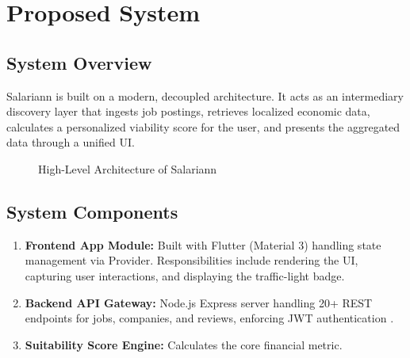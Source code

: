 \chapter{Proposed System}

\section{System Overview}
Salariann is built on a modern, decoupled architecture. It acts as an intermediary discovery layer that ingests job postings, retrieves localized economic data, calculates a personalized viability score for the user, and presents the aggregated data through a unified UI.

\begin{figure}[H]
\centering
{}
\caption{High-Level Architecture of Salariann}
\end{figure}

\section{System Components}
\begin{enumerate}
    \item \textbf{Frontend App Module:} Built with Flutter (Material 3) handling state management via Provider. Responsibilities include rendering the UI, capturing user interactions, and displaying the traffic-light badge.
    \item \textbf{Backend API Gateway:} Node.js Express server handling 20+ REST endpoints for jobs, companies, and reviews, enforcing JWT authentication \cite{nodejs}.
    \item \textbf{Suitability Score Engine:} Calculates the core financial metric.
\end{enumerate}

